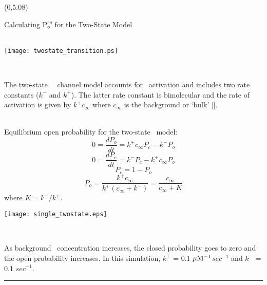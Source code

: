 \documentclass[a0]{a0poster}
\def\CHead#1{\begin{center} {\LARGE\color{DarkBlue} #1} \end{center} \bigskip}
\begin{document}


\begin{textblock}{7}(0,5.08)
\CHead{Calculating P$_o^{eq}$ for the Two-State Model}

\begin{minipage}{2in} 
\ \\
\texttt{[image: twostate\_transition.ps]}
\end{minipage}
\begin{minipage}{1in}
\ \\
\end{minipage}
\begin{minipage}{10in} 
The two-state \Ipr\ \Ca\ channel model accounts for \Ca\ activation and includes two rate constants ($k^-$ and $k^+$).
The latter rate constant is bimolecular and the rate of activation is given by $k^+c_\infty$ where $c_\infty$ is 
the background or `bulk' [\Ca]. 
\end{minipage}
\\

Equilibrium open probability for the two-state \Ipr\ model:
\[0 = \frac {dP_o} {dt} = k^+c_\infty P_c - k^-P_o\]
\[0 = \frac {dP_c} {dt} = k^-P_c - k^+c_\infty P_o\]
\[P_c = 1 - P_o \]
\[P_o = \frac {k^+ c_\infty} {k^+(c_\infty + k^-)} = 
\frac {c_\infty} {c_\infty+K} \] 
where $K = k^-/k^+$.

\begin{center}
\begin{minipage}{4in} 
\texttt{[image: single\_twostate.eps]} 
\end{minipage}
\begin{minipage}{1in} 
\ \\ 
\end{minipage}
\begin{minipage}{7in} 
As background \Ca\ concentration increases, the closed probability 
goes to zero and the open probability increases. In this simulation, $k^+$ = 0.1 $\mu{\rm M}^{-1}$$ sec^{-1}$ and $k^-$ = 0.1 $sec^{-1}$.

\end{minipage}
\end{center}

\bigskip
\hrule
\end{textblock}

\end{document}

